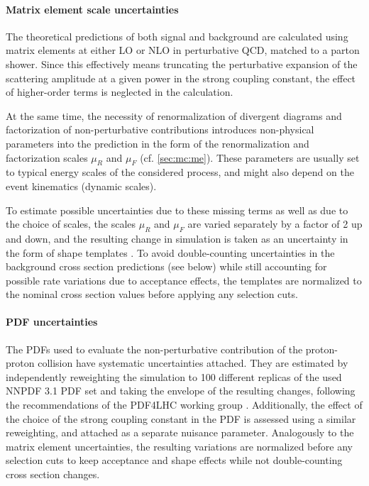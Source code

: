 \paragraph{Matrix element scale uncertainties}

The theoretical predictions of both signal and background are calculated using matrix elements at either LO or NLO in perturbative QCD, matched to a parton shower. Since this effectively means truncating the perturbative expansion of the scattering amplitude at a given power in the strong coupling constant, the effect of higher-order terms is neglected in the calculation.

At the same time, the necessity of renormalization of divergent diagrams and factorization of non-perturbative contributions introduces non-physical parameters into the prediction in the form of the renormalization and factorization scales $\mu_R$ and $\mu_F$ (cf. \cref{sec:mc:me}). These parameters are usually set to typical energy scales of the considered process, and might also depend on the event kinematics (dynamic scales).

To estimate possible uncertainties due to these missing terms as well as due to the choice of scales, the scales $\mu_R$ and $\mu_F$ are varied separately by a factor of 2 up and down, and the resulting change in simulation is taken as an uncertainty in the form of shape templates \cite{Cacciari:2004}. %
To avoid double-counting uncertainties in the background cross section predictions (see below) while still accounting for possible rate variations due to acceptance effects, the templates are normalized to the nominal cross section values before applying any selection cuts.

\paragraph{PDF uncertainties}

The PDFs used to evaluate the non-perturbative contribution of the proton-proton collision have systematic uncertainties attached. They are estimated by independently reweighting the simulation to 100 different replicas of the used NNPDF 3.1 PDF set and taking the envelope of the resulting changes, following the recommendations of the PDF4LHC working group \cite{Butterworth:2015oua}. Additionally, the effect of the choice of the strong coupling constant in the PDF is assessed using a similar reweighting, and attached as a separate nuisance parameter. Analogously to the matrix element uncertainties, the resulting variations are normalized before any selection cuts to keep acceptance and shape effects while not double-counting cross section changes.

